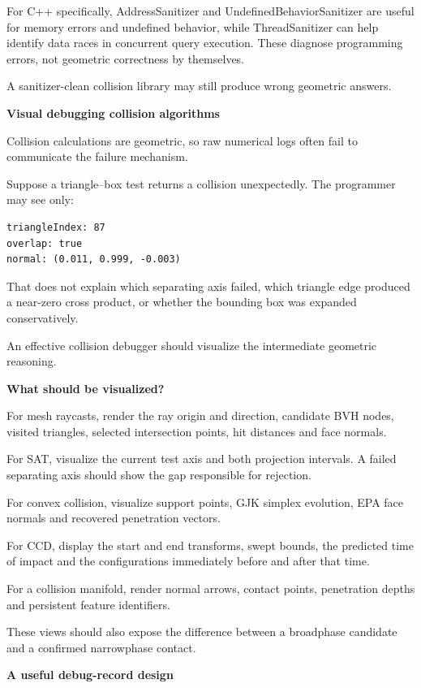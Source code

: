 For C++ specifically, AddressSanitizer and UndefinedBehaviorSanitizer are useful for memory errors and undefined behavior, while ThreadSanitizer can help identify data races in concurrent query execution. These diagnose programming errors, not geometric correctness by themselves.

A sanitizer-clean collision library may still produce wrong geometric answers.

\textbf{Visual debugging collision algorithms}

Collision calculations are geometric, so raw numerical logs often fail to communicate the failure mechanism.

Suppose a triangle--box test returns a collision unexpectedly. The programmer may see only:

\begin{verbatim}
triangleIndex: 87
overlap: true
normal: (0.011, 0.999, -0.003)
\end{verbatim}

That does not explain which separating axis failed, which triangle edge produced a near-zero cross product, or whether the bounding box was expanded conservatively.

An effective collision debugger should visualize the intermediate geometric reasoning.

\textbf{What should be visualized?}

For mesh raycasts, render the ray origin and direction, candidate BVH nodes, visited triangles, selected intersection points, hit distances and face normals.

For SAT, visualize the current test axis and both projection intervals. A failed separating axis should show the gap responsible for rejection.

For convex collision, visualize support points, GJK simplex evolution, EPA face normals and recovered penetration vectors.

For CCD, display the start and end transforms, swept bounds, the predicted time of impact and the configurations immediately before and after that time.

For a collision manifold, render normal arrows, contact points, penetration depths and persistent feature identifiers.

These views should also expose the difference between a broadphase candidate and a confirmed narrowphase contact.

\textbf{A useful debug-record design}


